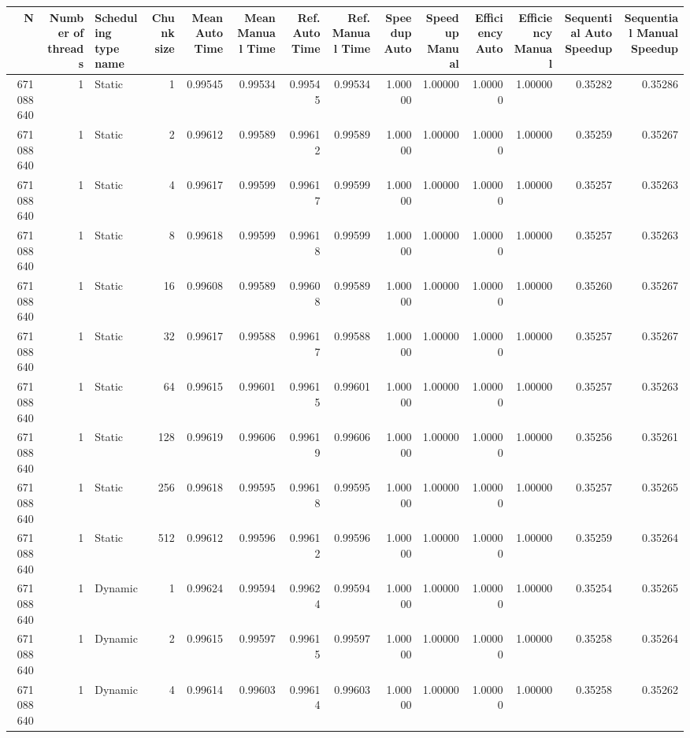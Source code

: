 \begin{tabular}{rrlrrrrrrrrrrr}
\toprule
N & Number of threads & Scheduling type name & Chunk size & Mean Auto Time & Mean Manual Time & Ref. Auto Time & Ref. Manual Time & Speedup Auto & Speedup Manual & Efficiency Auto & Efficiency Manual & Sequential Auto Speedup & Sequential Manual Speedup \\
\midrule
671088640 & 1 & Static & 1 & 0.99545 & 0.99534 & 0.99545 & 0.99534 & 1.00000 & 1.00000 & 1.00000 & 1.00000 & 0.35282 & 0.35286 \\
671088640 & 1 & Static & 2 & 0.99612 & 0.99589 & 0.99612 & 0.99589 & 1.00000 & 1.00000 & 1.00000 & 1.00000 & 0.35259 & 0.35267 \\
671088640 & 1 & Static & 4 & 0.99617 & 0.99599 & 0.99617 & 0.99599 & 1.00000 & 1.00000 & 1.00000 & 1.00000 & 0.35257 & 0.35263 \\
671088640 & 1 & Static & 8 & 0.99618 & 0.99599 & 0.99618 & 0.99599 & 1.00000 & 1.00000 & 1.00000 & 1.00000 & 0.35257 & 0.35263 \\
671088640 & 1 & Static & 16 & 0.99608 & 0.99589 & 0.99608 & 0.99589 & 1.00000 & 1.00000 & 1.00000 & 1.00000 & 0.35260 & 0.35267 \\
671088640 & 1 & Static & 32 & 0.99617 & 0.99588 & 0.99617 & 0.99588 & 1.00000 & 1.00000 & 1.00000 & 1.00000 & 0.35257 & 0.35267 \\
671088640 & 1 & Static & 64 & 0.99615 & 0.99601 & 0.99615 & 0.99601 & 1.00000 & 1.00000 & 1.00000 & 1.00000 & 0.35257 & 0.35263 \\
671088640 & 1 & Static & 128 & 0.99619 & 0.99606 & 0.99619 & 0.99606 & 1.00000 & 1.00000 & 1.00000 & 1.00000 & 0.35256 & 0.35261 \\
671088640 & 1 & Static & 256 & 0.99618 & 0.99595 & 0.99618 & 0.99595 & 1.00000 & 1.00000 & 1.00000 & 1.00000 & 0.35257 & 0.35265 \\
671088640 & 1 & Static & 512 & 0.99612 & 0.99596 & 0.99612 & 0.99596 & 1.00000 & 1.00000 & 1.00000 & 1.00000 & 0.35259 & 0.35264 \\
671088640 & 1 & Dynamic & 1 & 0.99624 & 0.99594 & 0.99624 & 0.99594 & 1.00000 & 1.00000 & 1.00000 & 1.00000 & 0.35254 & 0.35265 \\
671088640 & 1 & Dynamic & 2 & 0.99615 & 0.99597 & 0.99615 & 0.99597 & 1.00000 & 1.00000 & 1.00000 & 1.00000 & 0.35258 & 0.35264 \\
671088640 & 1 & Dynamic & 4 & 0.99614 & 0.99603 & 0.99614 & 0.99603 & 1.00000 & 1.00000 & 1.00000 & 1.00000 & 0.35258 & 0.35262 \\

\end{tabular}
